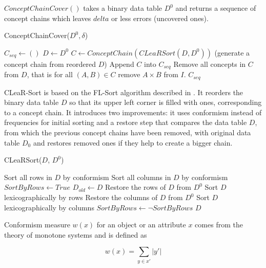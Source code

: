 \documentclass[acmconf,authordraft]{acmart}
\begin{document}
$ConceptChainCover()$ takes a binary data table $D^0$ and returns a sequence of concept chains which leaves $delta$ or less errors (uncovered ones).

\begin{algorithm}
\caption{ConceptChainCover($D^0, \delta$)}
\label{Meta-algorithm}
\begin{algorithmic}
\State $C_{seq} \gets ()$
\State $D \gets D^0$
    \State  $C \gets ConceptChain(CLeaRSort(D, D^0))$ (generate a concept chain from reordered $D$)
    \State Append $C$ into $C_{seq}$
    \State Remove all concepts in $C$ from $D$, that is for all $(A, B) \in C$ remove  $A \times B$ from $I$.
\EndWhile
\State \Return $C_{seq}$
\end{algorithmic}
\end{algorithm}

CLeaR-Sort is based on the FL-Sort algorithm described in \cite{torim_covering_2019}. It reorders the binary data table $D$ so that its upper left corner is filled with ones, corresponding to a concept chain.  It introduces two improvements: it uses conformism instead of frequencies for initial sorting and a restore step that compares the data table $D$, from which the previous concept chains have been removed, with original data table $D_0$ and restores removed ones if they help to create a bigger chain. 


\begin{algorithm}
\caption{CLeaRSort($D$, $D^0$)}
\label{CLeaR-Sort}
\begin{algorithmic}
\State Sort all rows in $D$ by conformism
\State Sort all columns in $D$ by conformism
\State $SortByRows \gets True$
    \State $D_{old} \gets D$
        \State Restore the rows of $D$ from $D^0$ 
        \State Sort $D$ lexicographically by rows
    \Else
        \State Restore the columns of $D$ from $D^0$
        \State Sort $D$ lexicographically by columns
    \EndIf
    \State $SortByRows \gets \neg SortByRows$
\EndWhile
\State \Return $D$
\end{algorithmic}
\end{algorithm}

Conformism measure $w(x)$ for an object or an attribute $x$ comes from the theory of monotone systems \cite{vohandu_algorithms_2006} and is defined as

\begin{equation}
w(x) = \sum_{y \in x'}|y'|
\label{ms_weight}
\end{equation}
\end{document}
